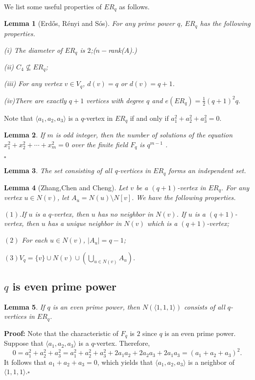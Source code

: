 \documentclass[12pt]{article}
\newtheorem{lemma}{Lemma}
\begin{document}
	\medskip
	We list some useful properties of $ER_q$ as follows.
	\begin{lemma}[Erd\H{o}s, R\'{e}nyi and S\'{o}s]
		For any prime power $q$, $ER_q$ has the following properties.
		
		\medskip
		(i) The diameter of $ER_q$ is $2$;($n-$rank($A$).)
		
		(ii) $C_4\nsubseteq ER_q$;
		
		(iii) For any vertex $v\in V_q$, $d(v)=q$ or $d(v)=q+1$.
		
		(iv)There are exactly $q+1$ vertices with degree $q$ and $e(ER_q)=\frac{1}{2}(q+1)^2q.$
	\end{lemma}
		Note that $\langle a_1,a_2,a_3 \rangle$ is a $q$-vertex in $ER_q$ if and only if $a_1^2+a_2^2+a_3^2=0$.
	\begin{lemma}
	If $m$ is odd integer, then  the number of solutions of the equation $x_1^2+x_2^2+\cdots+x_{m}^2=0$ over the finite field $F_q$ is $q^{m-1}$ .
	\end{lemma}
	 \hfill$\square$
	\begin{lemma}
The set consisting of all q-vertices in $E R_{q}$ forms an independent set.
	\end{lemma} 
	\begin{lemma}[Zhang,Chen and Cheng]
		Let $v$ be a $(q + 1)$-vertex in $ER_q$. For any vertex $u \in N(v)$, let $A_u = N(u) \setminus N[v]$. We have the following properties.
		
			$(1)$.If $u$ is a $q$-vertex, then $u$ has no neighbor in $N(v)$. If $u$ is a $(q + 1)$-vertex, then $u$ has a unique neighbor in $N(v)$ which is a $(q + 1)$-vertex;
			
			$(2)$ For each $u \in N(v)$, $|A_u| = q - 1$;
			
			$(3)$$V_q = \{v\} \cup N(v) \cup \left(\bigcup_{u \in N(v)} A_u\right)$.
	\end{lemma}
	\subsection{$q$ is even prime power}
	\begin{lemma}
		If $q$ is an even prime power, then $N(\langle 1,1,1\rangle )$ consists of all $q$-vertices in $ER_q$.
			\end{lemma}
			{\bf Proof:}	
			Note that the characteristic of $F_q$ is $2$ since $q$ is an even prime power. Suppose that $\langle a_1,a_2,a_3\rangle$ is a $q$-vertex. Therefore,
			\[
			0 = a_1^2 + a_2^2 + a_3^2 = a_1^2 + a_2^2 + a_3^2 + 2a_1a_2 + 2a_2a_3 + 2a_1a_3 = (a_1 + a_2 + a_3)^2.
			\]
			It follows that $a_1 + a_2 + a_3 = 0$, which yields that $\langle a_1,a_2,a_3\rangle$ is a neighbor of $\langle 1,1,1\rangle$.\hfill$\square$
\end{document}
